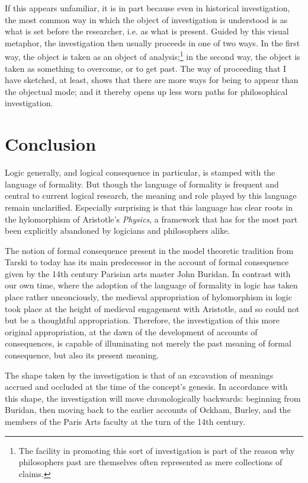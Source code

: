 \documentclass[]{article}
\begin{document}
If this appears unfamiliar, it is in part because even in historical investigation, the most common way in which the object of investigation is understood is as what is set before the researcher, i.e. as what is present. Guided by this visual metaphor, the investigation then usually proceeds in one of two ways. In the first way, the object is taken as an object of analysis;\footnote{The facility in promoting this sort of investigation is part of the reason why philosophers past are themselves often represented as mere collections of claims.} in the second way, the object is taken as something to overcome, or to get past. The way of proceeding that I have sketched, at least, shows that there are more ways for being to appear than the objectual mode; and it thereby opens up less worn paths for philosophical investigation.

\section{Conclusion}
Logic generally, and logical consequence in particular, is stamped with the language of formality. But though the language of formality is frequent and central to current logical research, the meaning and role played by this language remain unclarified. Especially surprising is that this language has clear roots in the hylomorphism of Aristotle's \textit{Physics}, a framework that has for the most part been explicitly abandoned by logicians and philosophers alike. 

The notion of formal consequence present in the model theoretic tradition from Tarski to today has its main predecessor in the account of formal consequence given by the 14th century Parisian arts master John Buridan. In contrast with our own time, where the adoption of the language of formality in logic has taken place rather unconciously, the medieval appropriation of hylomorphism in logic took place at the height of medieval engagement with Aristotle, and so could not but be a thoughtful appropriation. Therefore, the investigation of this more original appropriation, at the dawn of the development of accounts of consequences, is capable of illuminating not merely the past meaning of formal consequence, but also its present meaning. 

The shape taken by the investigation is that of an excavation of meanings accrued and occluded at the time of the concept's genesis. In accordance with this shape, the investigation will move chronologically backwards: beginning from Buridan, then moving back to the earlier accounts of Ockham, Burley, and the members of the Paris Arts faculty at the turn of the 14th century.
\end{document}
